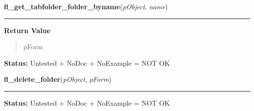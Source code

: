     \label{xformslib:library:fl_get_tabfolder_folder_byname}

    \vspace{0.5ex}

\hspace{.8\funcindent}\begin{boxedminipage}{\funcwidth}

    \raggedright \textbf{fl\_get\_tabfolder\_folder\_byname}(\textit{pObject}, \textit{name})

    \vspace{-1.5ex}

    \rule{\textwidth}{0.5\fboxrule}
\setlength{\parskip}{2ex}
\setlength{\parskip}{1ex}
      \textbf{Return Value}
    \vspace{-1ex}

      \begin{quote}
      pForm

      \end{quote}

\textbf{Status:} Untested + NoDoc + NoExample = NOT OK



    \end{boxedminipage}

    \label{xformslib:library:fl_delete_folder}

    \vspace{0.5ex}

\hspace{.8\funcindent}\begin{boxedminipage}{\funcwidth}

    \raggedright \textbf{fl\_delete\_folder}(\textit{pObject}, \textit{pForm})

    \vspace{-1.5ex}

    \rule{\textwidth}{0.5\fboxrule}
\setlength{\parskip}{2ex}
\setlength{\parskip}{1ex}
\textbf{Status:} Untested + NoDoc + NoExample = NOT OK



    \end{boxedminipage}

    \label{xformslib:library:fl_delete_folder_bynumber}

